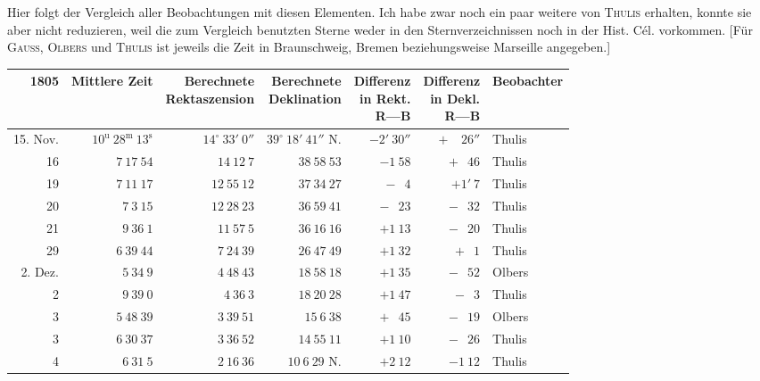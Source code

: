 \par\indent Hier folgt der Vergleich aller Beobachtungen mit diesen Elementen. Ich habe zwar noch ein paar weitere von \textsc{Thulis} erhalten, konnte sie aber nicht reduzieren, weil die zum Vergleich benutzten Sterne weder in den Sternverzeichnissen noch in der Hist. Cél. vorkommen. [Für \textsc{Gauss}, \textsc{Olbers} und \textsc{Thulis} ist jeweils die Zeit in Braunschweig, Bremen beziehungsweise Marseille angegeben.]
\begin{center}
\begingroup\fontsize{8}{10}\selectfont\setlength{\tabcolsep}{2pt}\renewcommand{\arraystretch}{1.1}
\begin{tabular}{r|r|r|r|r|r|l}
1805 & Mittlere Zeit & \shortstack{Berechnete\\Rektaszension} & \shortstack{Berechnete\\Deklination} & \shortstack{Differenz\\in Rekt.\\R---B} & \shortstack{Differenz\\in Dekl.\\R---B} & Beobachter\\ \hline
15. Nov. & $10^{\mathrm u}\ 28^{\mathrm m}\ 13^{\mathrm s}$ & $14^\circ\ 33'\ 0''$ & $39^\circ\ 18'\ 41''$ N. & $-2'\ 30''$ & $+\phantom{1'}\ 26''$ & Thulis\\
16 & $7\ 17\ 54$ & $14\ 12\ 7$ & $38\ 58\ 53$ & $-1\ 58$ & $+\phantom{1}\ 46$ & Thulis\\
19 & $7\ 11\ 17$ & $12\ 55\ 12$ & $37\ 34\ 27$ & $-\phantom{1}\ 4$ & $+1'\ 7$ & Thulis\\
20 & $7\ 3\ 15$ & $12\ 28\ 23$ & $36\ 59\ 41$ & $-\phantom{1}\ 23$ & $-\phantom{1}\ 32$ & Thulis\\
21 & $9\ 36\ 1$ & $11\ 57\ 5$ & $36\ 16\ 16$ & $+1\ 13$ & $-\phantom{1}\ 20$ & Thulis\\
29 & $6\ 39\ 44$ & $7\ 24\ 39$ & $26\ 47\ 49$ & $+1\ 32$ & $+\phantom{1}\ 1$ & Thulis\\
2. Dez. & $5\ 34\ 9$ & $4\ 48\ 43$ & $18\ 58\ 18$ & $+1\ 35$ & $-\phantom{1}\ 52$ & Olbers\\
2 & $9\ 39\ 0$ & $4\ 36\ 3$ & $18\ 20\ 28$ & $+1\ 47$ & $-\phantom{1}\ 3$ & Thulis\\
3 & $5\ 48\ 39$ & $3\ 39\ 51$ & $15\ 6\ 38$ & $+\phantom{1}\ 45$ & $-\phantom{1}\ 19$ & Olbers\\
3 & $6\ 30\ 37$ & $3\ 36\ 52$ & $14\ 55\ 11$ & $+1\ 10$ & $-\phantom{1}\ 26$ & Thulis\\
4 & $6\ 31\ 5$ & $2\ 16\ 36$ & $10\ 6\ 29$ N. & $+2\ 12$ & $-1\ 12$ & Thulis\\

\end{tabular}
\end{center}

